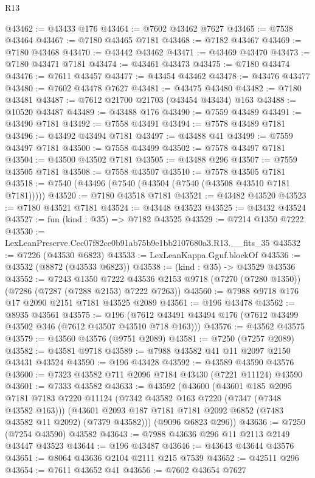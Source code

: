 \begin{lexlean}{R13}
\begin{coremodule}
@43462 := @43433 @176
@43464 := @7602 @43462 @7627
@43465 := @7538 @43464
@43467 := @7180 @43465 @7181
@43468 := @7182 @43467
@43469 := @7180 @43468
@43470 := @43442 @43462
@43471 := @43469 @43470
@43473 := @7180 @43471 @7181
@43474 := @43461 @43473
@43475 := @7180 @43474
@43476 := @7611 @43457
@43477 := @43454 @43462
@43478 := @43476 @43477
@43480 := @7602 @43478 @7627
@43481 := @43475 @43480
@43482 := @7180 @43481
@43487 := @7612 @21700 @21703 (@43454 @43434) @163
@43488 := @10520 @43487
@43489 := @43488 @176
@43490 := @7559 @43489
@43491 := @43490 @7181
@43492 := @7558 @43491
@43494 := @7578 @43489 @7181
@43496 := @43492 @43494 @7181
@43497 := @43488 @41
@43499 := @7559 @43497 @7181
@43500 := @7558 @43499
@43502 := @7578 @43497 @7181
@43504 := @43500 @43502 @7181
@43505 := @43488 @296
@43507 := @7559 @43505 @7181
@43508 := @7558 @43507
@43510 := @7578 @43505 @7181
@43518 := @7540 (@43496 (@7540 (@43504 (@7540 (@43508 @43510 @7181 @7181)))))
@43520 := @7180 @43518 @7181
@43521 := @43482 @43520
@43523 := @7180 @43521 @7181
@43524 := @43448 @43523
@43525 := @43432 @43524
@43527 := fun (kind : @35) => @7182 @43525
@43529 := @7214 @1350 @7222
@43530 := LexLeanPreserve.Cec07f82ce0b91ab75b9e1bb2107680a3.R13.__fits_35
@43532 := @7226 (@43530 @6823)
@43533 := LexLeanKappa.Gguf.blockOf
@43536 := @43532 (@8872 (@43533 @6823))
@43538 := (kind : @35) -> @43529 @43536
@43552 := @7243
    @1350
    @7222
    @43536
    @2153
    @9718
    (@7270 (@7280 @1350))
    (@7286 (@7287 (@7288 @2153) @7222 @7263))
@43560 := @7988 @9718 @176 @17 @2090 @2151 @7181 @43525 @2089
@43561 := @196 @43478
@43562 := @8935 @43561
@43575 := @196 (@7612 @43491 @43494 @176 (@7612 @43499 @43502 @346 (@7612 @43507 @43510 @718 @163)))
@43576 := @43562 @43575
@43579 := @43560 @43576 (@9751 @2089)
@43581 := @7250 (@7257 @2089)
@43582 := @43581 @9718
@43589 := @7988 @43582 @41 @11 @2097 @2150 @43431 @43524
@43590 := @196 @43428
@43592 := @43589 @43590 @43576
@43600 := @7323 @43582 @711 @2096 @7184 @43430 (@7221 @11124) @43590
@43601 := @7333 @43582
@43633 := @43592
    (@43600
      (@43601
        @185
        @2095
        @7181
        @7183
        @7220
        @11124
        (@7342 @43582 @163 @7220 (@7347 (@7348 @43582 @163)))
        (@43601 @2093 @187 @7181 @7181 @2092 @6852 (@7483 @43582 @11 @2092) (@7379 @43582)))
      (@9096 @6823 @296))
@43636 := @7250 (@7254 @43590) @43582
@43643 := @7988 @43636 @296 @11 @2113 @2149 @43447 @43523
@43644 := @196 @43487
@43646 := @43643 @43644 @43576
@43651 := @8064 @43636 @2104 @2111 @215 @7539
@43652 := @42511 @296
@43654 := @7611 @43652 @41
@43656 := @7602 @43654 @7627

\end{coremodule}
\end{lexlean}
